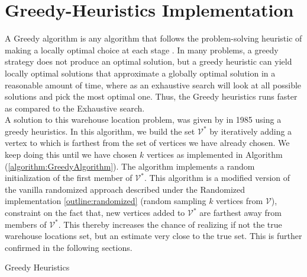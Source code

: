 \documentclass[longpaper, english, final, times]{revdetua}
\begin{document}
	\section{\label{outline:greedy} Greedy-Heuristics Implementation}
		A Greedy algorithm is any algorithm that follows the problem-solving heuristic of making a locally optimal choice at each stage \cite{black2012greedy}. In many problems, a greedy strategy does not produce an optimal solution, but a greedy heuristic can yield locally optimal solutions that approximate a globally optimal solution in a reasonable amount of time, where as an exhaustive search will look at all possible solutions and pick the most optimal one. Thus, the Greedy heuristics runs faster as compared to the Exhaustive search.\\
		
		A solution to this warehouse location problem, was given
		by \cite{GONZALEZ1985293} in 1985 using a greedy heuristics. In this algorithm, we build the set $\mathcal{V^{*}}$ by iteratively adding a vertex to which is farthest from the set of vertices we have already chosen. We keep doing this until
		we have chosen $k$ vertices as implemented in Algorithm (\ref{algorithm:GreedyAlgorithm}). The algorithm implements a random initialization of the first member of $\mathcal{V^{*}}$. This algorithm is a modified version of the vanilla randomized approach described under the Randomized implementation \ref{outline:randomized} (random sampling $k$ vertices from $\mathcal{V}$), constraint on the fact that, new vertices added to $\mathcal{V^{*}}$ are farthest away from members of $\mathcal{V^{*}}$. This thereby increases the chance of realizing if not the true warehouse locations set, but an estimate very close to the true set. This is further confirmed in the following sections.\\
		
		\begin{algorithm}
			\caption{Greedy Heuristics}
			\label{algorithm:GreedyAlgorithm}
			\DontPrintSemicolon
			
			
			
		\end{algorithm}
	
\end{document}
